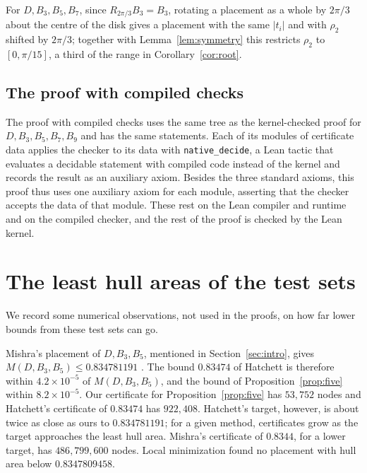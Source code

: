 \documentclass[11pt]{amsart}
\theoremstyle{definition}
\theoremstyle{remark}
\numberwithin{equation}{section}
\newcommand{\NodesThree}{53{,}752}
\begin{document}
For $D,B_3,B_5,B_7$, since $R_{2\pi/3}B_3=B_3$, rotating a placement as a whole by $2\pi/3$ about the centre of the disk gives a placement with the same $|t_i|$ and with $\rho_2$ shifted by $2\pi/3$; together with Lemma~\ref{lem:symmetry} this restricts $\rho_2$ to $[0,\pi/15]$, a third of the range in Corollary~\ref{cor:root}.

\subsection{The proof with compiled checks}
The proof with compiled checks uses the same tree as the kernel-checked proof for $D,B_3,B_5,B_7,B_9$ and has the same statements. Each of its modules of certificate data applies the checker to its data with \texttt{native\_decide}, a Lean tactic that evaluates a decidable statement with compiled code instead of the kernel and records the result as an auxiliary axiom. Besides the three standard axioms, this proof thus uses one auxiliary axiom for each module, asserting that the checker accepts the data of that module. These rest on the Lean compiler and runtime and on the compiled checker, and the rest of the proof is checked by the Lean kernel.


\section{The least hull areas of the test sets}\label{sec:limits}

We record some numerical observations, not used in the proofs, on how far lower bounds from these test sets can go.

Mishra's placement of $D,B_3,B_5$, mentioned in Section~\ref{sec:intro}, gives $M(D,B_3,B_5)\le0.834781191$ \cite[Section~3]{Mis26}. The bound $0.83474$ of Hatchett \cite{Hat26} is therefore within $4.2\times10^{-5}$ of $M(D,B_3,B_5)$, and the bound of Proposition~\ref{prop:five} within $8.2\times10^{-5}$. Our certificate for Proposition~\ref{prop:five} has $\NodesThree$ nodes and Hatchett's certificate of $0.83474$ has $922{,}408$. Hatchett's target, however, is about twice as close as ours to $0.834781191$; for a given method, certificates grow as the target approaches the least hull area. Mishra's certificate of $0.8344$, for a lower target, has $486{,}799{,}600$ nodes. Local minimization found no placement with hull area below $0.8347809458$.
\end{document}
